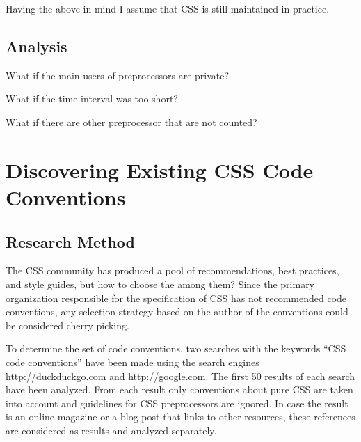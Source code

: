 \documentclass[parskip=full]{uvamscse}
\begin{document}
Having the above in mind I assume that CSS is still maintained in practice.

\section{Analysis}

What if the main users of preprocessors are private?

What if the time interval was too short?

What if there are other preprocessor that are not counted?


\chapter{Discovering Existing CSS Code Conventions}

\section{Research Method}

The CSS community has produced a pool of recommendations, best practices, and style guides, but how
to choose the among them? Since the primary organization responsible for the specification of CSS
has not recommended code conventions, any selection strategy based on the author of the conventions
could be considered cherry picking.

To determine the set of code conventions, two searches with the keywords “CSS code conventions” have
been made using the search engines http://duckduckgo.com and http://google.com. The first 50 results
of each search have been analyzed. From each result only conventions about pure CSS are taken into
account and guidelines for CSS preprocessors are ignored. In case the result is an online magazine
or a blog post that links to other resources, these references are considered as results and
analyzed separately.
\end{document}
